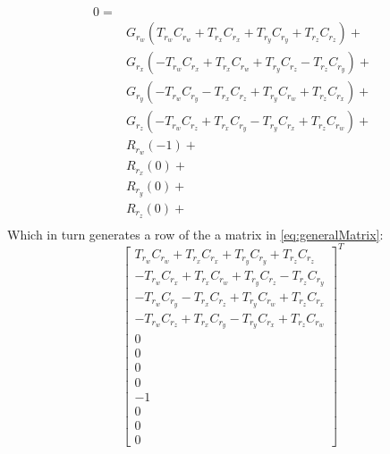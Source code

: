 \documentclass[12pt]{article}
\begin{document}
	\begin{equation}
		\begin{split}
			0=\\&
			G_{r_w}(T_{r_w}C_{r_w}+T_{r_x}C_{r_x}+T_{r_y}C_{r_y}+T_{r_z}C_{r_z})+\\&
			G_{r_x}(-T_{r_w}C_{r_x}+T_{r_x}C_{r_w}+T_{r_y}C_{r_z}-T_{r_z}C_{r_y})+\\&
			G_{r_y}(-T_{r_w}C_{r_y}-T_{r_x}C_{r_z}+T_{r_y}C_{r_w}+T_{r_z}C_{r_x})+\\&
			G_{r_z}(-T_{r_w}C_{r_z}+T_{r_x}C_{r_y}-T_{r_y}C_{r_x}+T_{r_z}C_{r_w})+\\&
			R_{r_w}(-1)+\\&
			R_{r_x}(0)+\\&
			R_{r_y}(0)+\\&
			R_{r_z}(0)+\\&
		\end{split}
	\end{equation}
	Which in turn generates a row of the a matrix in \autoref{eq:generalMatrix}:
	\begin{equation}
		\begin{bmatrix}
			T_{r_w}C_{r_w}+T_{r_x}C_{r_x}+T_{r_y}C_{r_y}+T_{r_z}C_{r_z} \\
			-T_{r_w}C_{r_x}+T_{r_x}C_{r_w}+T_{r_y}C_{r_z}-T_{r_z}C_{r_y} \\
			-T_{r_w}C_{r_y}-T_{r_x}C_{r_z}+T_{r_y}C_{r_w}+T_{r_z}C_{r_x} \\
			-T_{r_w}C_{r_z}+T_{r_x}C_{r_y}-T_{r_y}C_{r_x}+T_{r_z}C_{r_w} \\
			0 \\ 0 \\ 0 \\ 0 \\ -1 \\ 0 \\ 0 \\ 0
		\end{bmatrix}^T
	\end{equation}
\end{document}

